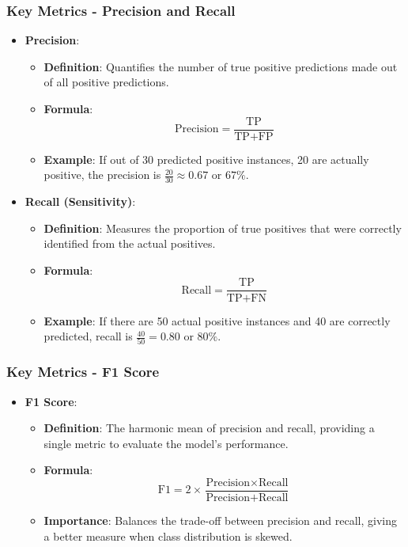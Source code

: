 \documentclass[aspectratio=169]{beamer}
\begin{document}
\begin{frame}[fragile]
    \frametitle{Key Metrics - Precision and Recall}
    \begin{itemize}
        \item \textbf{Precision}:
        \begin{itemize}
            \item \textbf{Definition}: Quantifies the number of true positive predictions made out of all positive predictions.
            \item \textbf{Formula}:
            \begin{equation}
            \text{Precision} = \frac{\text{TP}}{\text{TP} + \text{FP}}
            \end{equation}
            \item \textbf{Example}: If out of 30 predicted positive instances, 20 are actually positive, the precision is 
            \( \frac{20}{30} \approx 0.67 \text{ or } 67\% \).
        \end{itemize}

        \item \textbf{Recall (Sensitivity)}:
        \begin{itemize}
            \item \textbf{Definition}: Measures the proportion of true positives that were correctly identified from the actual positives.
            \item \textbf{Formula}:
            \begin{equation}
            \text{Recall} = \frac{\text{TP}}{\text{TP} + \text{FN}}
            \end{equation}
            \item \textbf{Example}: If there are 50 actual positive instances and 40 are correctly predicted, 
            recall is \( \frac{40}{50} = 0.80 \text{ or } 80\% \).
        \end{itemize}
    \end{itemize}
\end{frame}

\begin{frame}[fragile]
    \frametitle{Key Metrics - F1 Score}
    \begin{itemize}
        \item \textbf{F1 Score}:
        \begin{itemize}
            \item \textbf{Definition}: The harmonic mean of precision and recall, providing a single metric to evaluate the model's performance.
            \item \textbf{Formula}:
            \begin{equation}
            \text{F1} = 2 \times \frac{\text{Precision} \times \text{Recall}}{\text{Precision} + \text{Recall}}
            \end{equation}
            \item \textbf{Importance}: Balances the trade-off between precision and recall, giving a better measure when class distribution is skewed.
        \end{itemize}
    \end{itemize}
\end{frame}
\end{document}
